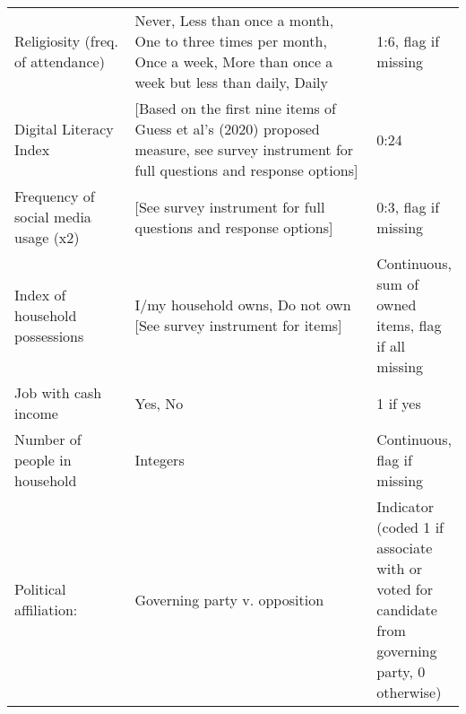 \begin{table}[H]
\begin{adjustbox}{totalheight=.9\baselineskip, max width = \textwidth}
\begin{tabular}{p{0.3\linewidth}p{0.7\linewidth}p{0.25\linewidth}}
Religiosity (freq. of attendance)                   & Never, Less than once a month, One to three times per month, Once a week, More than once a week but less than daily, Daily                                                                                                          & 1:6, flag if missing                                                                           \\
Digital Literacy Index                              & {[}Based on the first nine items of Guess et al's (2020) proposed measure, see survey instrument for full questions and response options{]}                                                                                         & 0:24                                                                                           \\
Frequency of social media usage (x2)                & {[}See survey instrument for full questions and response options{]}                                                                                                                                                                 & 0:3, flag if missing                                                                           \\
Index of household possessions                      & I/my household owns, Do not own {[}See survey instrument for items{]}                                                                                                                                                               & Continuous, sum of owned items, flag if all missing                                            \\
Job with cash income                                & Yes, No                                                                                                                                                                                                                             & 1 if yes                                                                                       \\
Number of people in household                       & Integers                                                                                                                                                                                                                            & Continuous, flag if missing                                                                    \\
Political affiliation:                              & Governing party v. opposition                                                                                                                                                                                                       & Indicator (coded 1 if associate with or voted for candidate from governing party, 0 otherwise) \\

\end{tabular}
\end{adjustbox}
\end{table}

